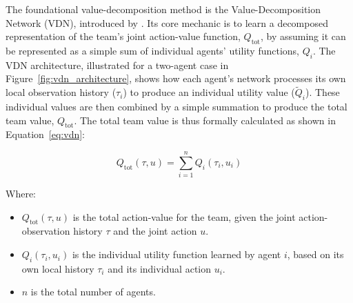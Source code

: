 The foundational value-decomposition method is the Value-Decomposition Network (VDN), introduced by \parencite{VDN}. Its core mechanic is to learn a decomposed representation of the team's joint action-value function, $Q_{\text{tot}}$, by assuming it can be represented as a simple sum of individual agents' utility functions, $Q_i$. The VDN architecture, illustrated for a two-agent case in Figure~\ref{fig:vdn_architecture}, shows how each agent's network processes its own local observation history ($\tau_i$) to produce an individual utility value ($\tilde{Q}_i$). These individual values are then combined by a simple summation to produce the total team value, $Q_{\text{tot}}$. The total team value is thus formally calculated as shown in Equation~\eqref{eq:vdn}:



\begin{equation}
    \label{eq:vdn}
    Q_{\text{tot}}(\tau,u) = \sum_{i=1}^{n} Q_i(\tau_i, u_i)
\end{equation}

Where:
\begin{itemize}
    \item $Q_{\text{tot}}(\tau, u)$ is the total action-value for the team, given the joint action-observation history $\tau$ and the joint action $u$.
    \item $Q_i(\tau_i, u_i)$ is the individual utility function learned by agent $i$, based on its own local history $\tau_i$ and its individual action $u_i$.
    \item $n$ is the total number of agents.
\end{itemize}

